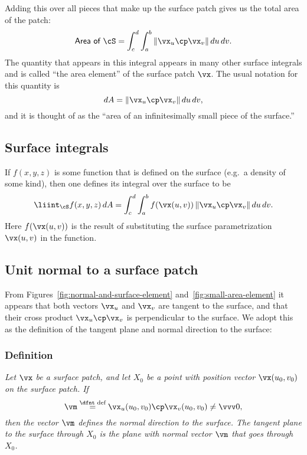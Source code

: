 Adding this over all pieces that make up the surface patch gives us the total area of
the patch:
\begin{equation}
  \textsf{Area of $\cS$} = \int_c^d \int_a^b \|\vx_u\cp\vx_v\| \,du\,dv .
  \label{eq:area-of-surface-patch}
\end{equation}
The quantity that appears in this integral appears in many other surface integrals
and is called ``the area element'' of the surface patch $\vx$.  The usual notation
for this quantity is
\begin{equation}
  dA = \|\vx_u\cp\vx_v\| \,du\,dv,
  \label{eq:area-element-for-surface-patch}
\end{equation}
and it is thought of as the ``area of an infinitesimally small piece of the
surface.''  

\subsection{Surface integrals}
\label{sec:surface-integrals}
If $f(x, y, z)$ is some function that is defined on the surface (e.g.~a density of
some kind), then one defines its integral over the surface to be
\begin{equation}
  \liint_{\cS} f(x, y, z)\, dA
  =
 \int_c^d \int_a^b f(\vx(u,v))\,\|\vx_u\cp\vx_v\| \,du\,dv .
  \label{eq:surface-integral-def}
\end{equation}
Here $f(\vx(u,v))$ is the result of substituting the surface parametrization
$\vx(u,v)$ in the function.

\subsection{Unit normal to a surface patch}
\label{sec:unit-normal-to-patch}
From Figures~\ref{fig:normal-and-surface-element} and~\ref{fig:small-area-element} it
appears that both vectors $\vx_u$ and $\vx_v$ are tangent to the surface, and that
their cross product $\vx_u\cp\vx_v$ is perpendicular to the surface.  We adopt this
as the definition of the tangent plane and normal direction to the surface:
\medskip

\subsubsection*{Definition}\itshape Let $\vx$ be a surface patch, and let $X_0$ be a
point with position vector $\vx(u_0,v_0)$ on the surface patch.  If
\[
  \vm \stackrel{\text{\dfnt def}}=\vx_u(u_0,v_0) \cp \vx_v(u_0,v_0)\neq \vvv0,
\]
then the vector $\vm$ defines the normal direction to the surface. The tangent
plane to the surface through $X_0$ is the plane with normal vector $\vm$ that goes
through $X_0$.\upshape\medskip

